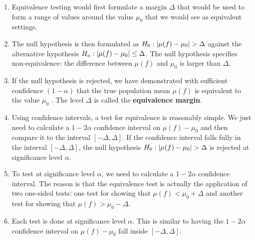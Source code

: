 \begin{enumerate}
    \item  Equivalence testing would first formulate a margin $\Delta$ that would be used to form a range of values around the value $\mu_0$ that we would see as equivalent settings. 
    \hfill \cite{statistics/book/Statistics-for-Data-Scientists/Maurits-Kaptein}

    \item  The null hypothesis is then formulated as $H_0 : \left| \mu( f ) - \mu_0 \right| > \Delta$ against the alternative hypothesis $H_a : \left| \mu( f ) - \mu_0 \right| \leq \Delta$. 
    The null hypothesis specifies non-equivalence: the difference between $\mu( f )$ and $\mu_0$ is larger than $\Delta$.
    \hfill \cite{statistics/book/Statistics-for-Data-Scientists/Maurits-Kaptein}

    \item  If the null hypothesis is rejected, we have demonstrated with sufficient confidence $(1 - \alpha)$ that the true population mean $\mu( f )$ is equivalent to the value $\mu_0$ . 
    The level $\Delta$ is called the \textbf{equivalence margin}.
    \hfill \cite{statistics/book/Statistics-for-Data-Scientists/Maurits-Kaptein}

    \item Using confidence intervals, a test for equivalence is reasonably simple. 
    We just need to calculate a $1 - 2\alpha$ confidence interval on $\mu( f ) - \mu_0$ and then compare it to the interval $[-\Delta, \Delta]$. 
    If the confidence interval falls fully in the interval $[-\Delta, \Delta]$, the null hypothesis $H_0 : \left| \mu( f ) - \mu_0 \right| > \Delta$ is rejected at significance level $\alpha$. 
    \hfill \cite{statistics/book/Statistics-for-Data-Scientists/Maurits-Kaptein}

    \item To test at significance level $\alpha$, we need to calculate a $1 - 2\alpha$ confidence interval. 
    The reason is that the equivalence test is actually the application of two one-sided tests: one test for showing that $\mu( f ) < \mu_0 + \Delta$ and another test for showing that $\mu( f ) > \mu_0 - \Delta$.
    \hfill \cite{statistics/book/Statistics-for-Data-Scientists/Maurits-Kaptein}

    \item Each test is done at significance level $\alpha$. 
    This is similar to having the $1 - 2\alpha$ confidence interval on $\mu( f ) - \mu_0$ fall inside $[-\Delta, \Delta]$.
    \hfill \cite{statistics/book/Statistics-for-Data-Scientists/Maurits-Kaptein}


\end{enumerate}
